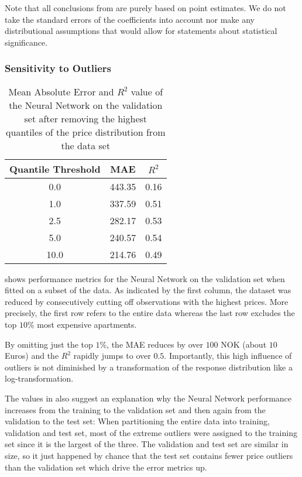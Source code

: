Note that all conclusions from  are purely based on point estimates.
We do not take the standard errors of the coefficients into account nor make any distributional assumptions that would allow for statements about statistical significance.


\subsubsection{Sensitivity to Outliers} \label{outliers}

\begin{table}[t]
  \centering
  \begin{tabular}{@{}ccc@{}}
    \toprule
    Quantile Threshold & MAE    & $R^2$ \\ \midrule
    0.0                & 443.35 & 0.16  \\
    1.0                & 337.59 & 0.51  \\
    2.5                & 282.17 & 0.53  \\
    5.0                & 240.57 & 0.54  \\
    10.0               & 214.76 & 0.49  \\ \bottomrule
  \end{tabular}
  \caption{Mean Absolute Error and $R^2$ value of the Neural Network on the validation set after removing the highest quantiles of the price distribution from the data set}
  \label{tab:mlp-outliers}
\end{table}

 shows performance metrics for the Neural Network on the validation set when fitted on a subset of the data.
As indicated by the first column, the dataset was reduced by consecutively cutting off observations with the highest prices.
More precisely, the first row refers to the entire data whereas the last row excludes the top $10$\% most expensive apartments.

By omitting just the top $1$\%, the MAE reduces by over $100$ NOK (about $10$ Euros) and the $R^2$ rapidly jumps to over $0.5$.
Importantly, this high influence of outliers is not diminished by a transformation of the response distribution like a log-transformation.

The values in  also suggest an explanation why the Neural Network performance increases from the training to the validation set and then again from the validation to the test set:
When partitioning the entire data into training, validation and test set, most of the extreme outliers were assigned to the training set since it is the largest of the three.
The validation and test set are similar in size, so it just happened by chance that the test set contains fewer price outliers than the validation set which drive the error metrics up.

